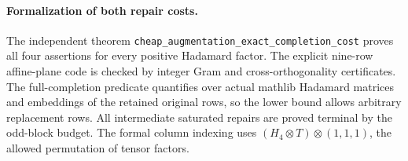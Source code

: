 \paragraph{Formalization of both repair costs.} The independent theorem \texttt{cheap\_\allowbreak augmentation\_\allowbreak exact\_\allowbreak completion\_\allowbreak cost} proves all four assertions for every positive Hadamard factor. The explicit nine-row affine-plane code is checked by integer Gram and cross-orthogonality certificates. The full-completion predicate quantifies over actual mathlib Hadamard matrices and embeddings of the retained original rows, so the lower bound allows arbitrary replacement rows. All intermediate saturated repairs are proved terminal by the odd-block budget. The formal column indexing uses $(H_4\otimes T)\otimes(1,1,1)$, the allowed permutation of tensor factors.
